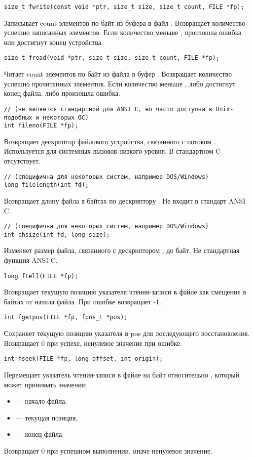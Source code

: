 \begin{verbatim}
size_t fwrite(const void *ptr, size_t size, size_t count, FILE *fp);
\end{verbatim}
Записывает count элементов по  байт из буфера  в файл . Возвращает количество успешно записанных элементов. Если количество меньше , произошла ошибка или достигнут конец устройства.

\begin{verbatim}
size_t fread(void *ptr, size_t size, size_t count, FILE *fp);
\end{verbatim}
Читает count элементов по  байт из файла  в буфер . Возвращает количество успешно прочитанных элементов. Если количество меньше , либо достигнут конец файла, либо произошла ошибка.

\begin{verbatim}
// (не является стандартной для ANSI C, но часто доступна в Unix-подобных и некоторых ОС)
int fileno(FILE *fp);
\end{verbatim}
Возвращает дескриптор файлового устройства, связанного с потоком . Используется для системных вызовов низкого уровня. В стандартном C отсутствует.

\begin{verbatim}
// (специфична для некоторых систем, например DOS/Windows)
long filelength(int fd);
\end{verbatim}
Возвращает длину файла в байтах по дескриптору . Не входит в стандарт ANSI C.

\begin{verbatim}
// (специфична для некоторых систем, например DOS/Windows)
int chsize(int fd, long size);
\end{verbatim} 
Изменяет размер файла, связанного с дескриптором , до  байт. Не стандартная функция ANSI C.

\begin{verbatim}
long ftell(FILE *fp);
\end{verbatim}
Возвращает текущую позицию указателя чтения-записи в файле  как смещение в байтах от начала файла. При ошибке возвращает -1.

\begin{verbatim}
int fgetpos(FILE *fp, fpos_t *pos);
\end{verbatim}
Сохраняет текущую позицию указателя в pos для последующего восстановления. Возвращает 0 при успехе, ненулевое значение при ошибке.

\begin{verbatim}
int fseek(FILE *fp, long offset, int origin);
\end{verbatim}
Перемещает указатель чтения-записи в файле  на  байт относительно , который может принимать значения:
\begin{itemize}
\item {} --- начало файла,
\item {} --- текущая позиция,
\item {} --- конец файла.
\end{itemize}
Возвращает 0 при успешном выполнении, иначе ненулевое значение.


